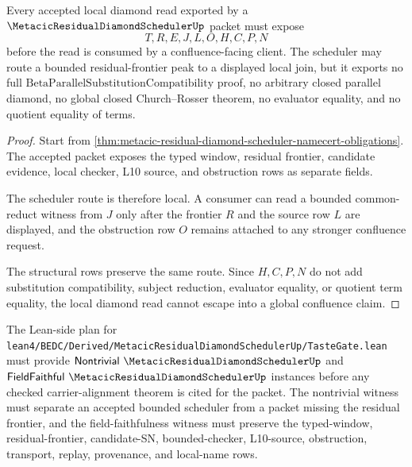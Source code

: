 \begin{theorem}
\label{thm:metacic-residual-diamond-scheduler-boundary}
Every accepted local diamond read exported by a $\MetacicResidualDiamondSchedulerUp$ packet must expose
$$
T,R,E,J,L,O,H,C,P,N
$$
before the read is consumed by a confluence-facing client. The scheduler may route a bounded residual-frontier peak to a displayed local join, but it exports no full $\mathrm{BetaParallelSubstitutionCompatibility}$ proof, no arbitrary closed parallel diamond, no global closed Church--Rosser theorem, no evaluator equality, and no quotient equality of terms.
\end{theorem}
\begin{proof}
Start from \autoref{thm:metacic-residual-diamond-scheduler-namecert-obligations}. The accepted packet exposes the typed window, residual frontier, candidate evidence, local checker, L10 source, and obstruction rows as separate fields.

The scheduler route is therefore local. A consumer can read a bounded common-reduct witness from $J$ only after the frontier $R$ and the source row $L$ are displayed, and the obstruction row $O$ remains attached to any stronger confluence request.

The structural rows preserve the same route. Since $H,C,P,N$ do not add substitution compatibility, subject reduction, evaluator equality, or quotient term equality, the local diamond read cannot escape into a global confluence claim.
\end{proof}



The Lean-side plan for \texttt{lean4/BEDC/Derived/MetacicResidualDiamondSchedulerUp/TasteGate.lean} must provide $\mathsf{Nontrivial}\ \MetacicResidualDiamondSchedulerUp$ and $\mathsf{FieldFaithful}\ \MetacicResidualDiamondSchedulerUp$ instances before any checked carrier-alignment theorem is cited for the packet. The nontrivial witness must separate an accepted bounded scheduler from a packet missing the residual frontier, and the field-faithfulness witness must preserve the typed-window, residual-frontier, candidate-SN, bounded-checker, L10-source, obstruction, transport, replay, provenance, and local-name rows.

